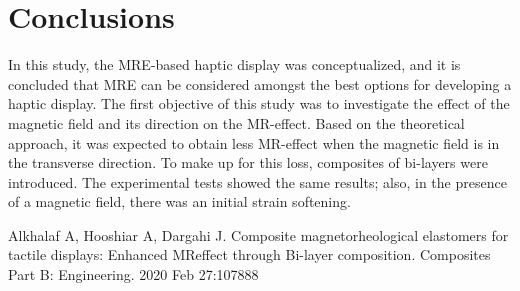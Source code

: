 \documentclass[conference]{IEEEtran}
\begin{document}
\section{Conclusions}
In this study, the MRE-based haptic display was conceptualized, and it is concluded that MRE can be considered amongst the best options for developing a haptic display. The first objective of this study was to investigate the effect of the magnetic field and its direction on the MR-effect. Based on the theoretical approach, it was expected to obtain less MR-effect when the magnetic field is in the transverse direction. To make up for this loss, composites of bi-layers were introduced. The experimental tests showed the same results; also, in the presence of a magnetic field, there was an initial strain softening.  
% 
%
\begin{thebibliography}{00}
 Alkhalaf A, Hooshiar A, Dargahi J. Composite magnetorheological elastomers for tactile displays: Enhanced MReffect through Bi-layer composition. Composites Part B: Engineering. 2020 Feb 27:107888
\end{thebibliography}
\end{document}
